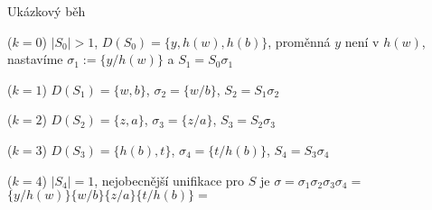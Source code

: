 \documentclass{beamer}
\begin{document}
\begin{frame}{Ukázkový běh}

    \pause
    \vspace{-6pt}

    \vspace{-1pt}
    
    \pause
    \alert{($k=0$)} $|S_0|>1$, $D(S_0)=\{y,h(w),h(b)\}$, proměnná $y$ není v $h(w)$, nastavíme $\sigma_1:=\{y/h(w)\}$ a $S_1=S_0\sigma_1$
    
    \pause

    \vspace{-1pt}

    \pause
    \alert{($k=1$)} $D(S_1)=\{w,b\}$, $\sigma_2=\{w/b\}$, $S_2=S_1\sigma_2$    
    
    \pause

    \vspace{-1pt}
    \pause
    \alert{($k=2$)} $D(S_2)=\{z,a\}$, $\sigma_3=\{z/a\}$, $S_3=S_2\sigma_3$    
    
    \pause

    \vspace{-1pt}

    \pause
    \alert{($k=3$)} $D(S_3)=\{h(b),t\}$, $\sigma_4=\{t/h(b)\}$, $S_4=S_3\sigma_4$    
    
    \pause

    \vspace{-1pt}

    \pause
    \alert{($k=4$)} $|S_4|=1$, nejobecnější unifikace pro $S$ je
    $\sigma=\sigma_1\sigma_2\sigma_3\sigma_4=$\\    
    $\{y/h(w)\}\{w/b\}\{z/a\}\{t/h(b)\}=$    

\end{frame}
\end{document}
